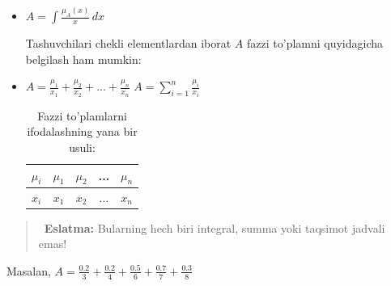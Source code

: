 \documentclass[12pt]{article}
\begin{document}
	\begin{itemize}
		\item $A=\int \frac{\mu_A(x)}{x} \, dx$
		
		Tashuvchilari chekli elementlardan iborat $A$ fazzi to'plamni quyidagicha belgilash ham mumkin:
		
		\item $A=\frac{\mu_1}{x_1}+\frac{\mu_2}{x_2}+...+\frac{\mu_n}{x_n}$
		$A=\sum_{i=1}^{n}\frac{\mu_i}{x_i}$
		
		\begin{table}[h]
			\centering
			\caption{Fazzi to'plamlarni ifodalashning yana bir usuli:}
			\vspace{2mm}
			\begin{tabular}{c|c|c|c|c}
				\toprule
				$\mu_i$ & $\mu_1$ & $\mu_2$ & ...& $\mu_n$ \\ \midrule
				$x_i$ & $x_1$ & $x_2$ & ... &$x_n$ \\ \bottomrule
			\end{tabular}
		\end{table}
		
	\end{itemize}
	
	\begin{quote}
		\faExclamationTriangle\ \textbf{Eslatma:} Bularning hech biri integral, summa yoki taqsimot jadvali emas!
	\end{quote}


Masalan, $A=\frac{0.2}{3}+\frac{0.2}{4}+\frac{0.5}{6}+\frac{0.7}{7}+\frac{0.3}{8}$
\end{document}
